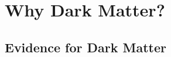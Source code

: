 
\newcommand{\pdirone}{chapters/plots/chapter1}


\chapter{Why Dark Matter?} %

\label{chapter1}




\section{Evidence for Dark Matter}
\label{ch1:sec:dm-evidence}


